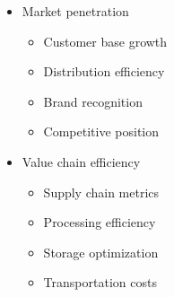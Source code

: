 \begin{itemize}
\begin{itemize}
        \item Market penetration
        \begin{itemize}
            \item Customer base growth
            \item Distribution efficiency
            \item Brand recognition
            \item Competitive position
        \end{itemize}
        
        \item Value chain efficiency
        \begin{itemize}
            \item Supply chain metrics
            \item Processing efficiency
            \item Storage optimization
            \item Transportation costs
        \end{itemize}
    \end{itemize}
\end{itemize}

